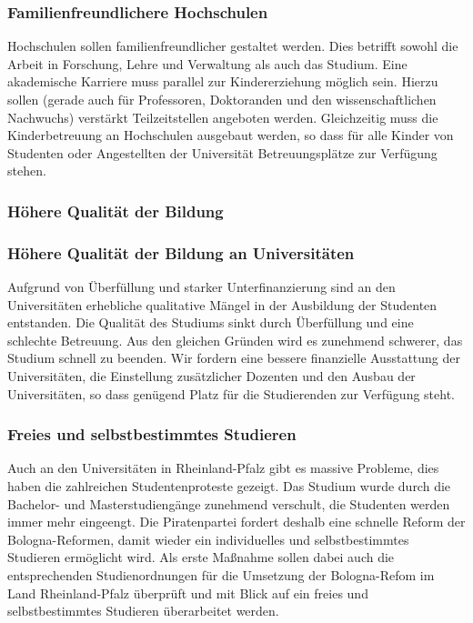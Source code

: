 \subsubsection{Familienfreundlichere Hochschulen}
\abstimmung
Hochschulen sollen familienfreundlicher gestaltet werden. Dies betrifft sowohl die Arbeit in Forschung, Lehre und Verwaltung als auch das Studium. Eine akademische Karriere muss parallel zur Kindererziehung möglich sein. Hierzu sollen (gerade auch für Professoren, Doktoranden und den wissenschaftlichen Nachwuchs) verstärkt Teilzeitstellen angeboten werden. Gleichzeitig muss die Kinderbetreuung an Hochschulen ausgebaut werden, so dass für alle Kinder von Studenten oder Angestellten der Universität Betreuungsplätze zur Verfügung stehen.
 
\subsubsection{Höhere Qualität der Bildung}

\subsubsection{Höhere Qualität der Bildung an Universitäten}
\abstimmung
Aufgrund von Überfüllung und starker Unterfinanzierung sind an den Universitäten erhebliche qualitative Mängel in der Ausbildung der Studenten entstanden. Die Qualität des Studiums sinkt durch Überfüllung und eine schlechte Betreuung. Aus den gleichen Gründen wird es zunehmend schwerer, das Studium schnell zu beenden. Wir fordern eine bessere finanzielle Ausstattung der Universitäten, die Einstellung zusätzlicher Dozenten und den Ausbau der Universitäten, so dass genügend Platz für die Studierenden zur Verfügung steht.

\newpage
{}

\subsubsection{Freies und selbstbestimmtes Studieren}
\abstimmung
Auch an den Universitäten in Rheinland-Pfalz gibt es massive Probleme, dies haben die zahlreichen Studentenproteste gezeigt. Das Studium wurde durch die Bachelor- und Masterstudiengänge zunehmend verschult, die Studenten werden immer mehr eingeengt. Die Piratenpartei fordert deshalb eine schnelle Reform der Bologna-Reformen, damit wieder ein individuelles und selbstbestimmtes Studieren ermöglicht wird. Als erste Maßnahme sollen dabei auch die entsprechenden Studienordnungen für die Umsetzung der Bologna-Refom im Land Rheinland-Pfalz überprüft und mit Blick auf ein freies und selbstbestimmtes Studieren überarbeitet werden.
 
